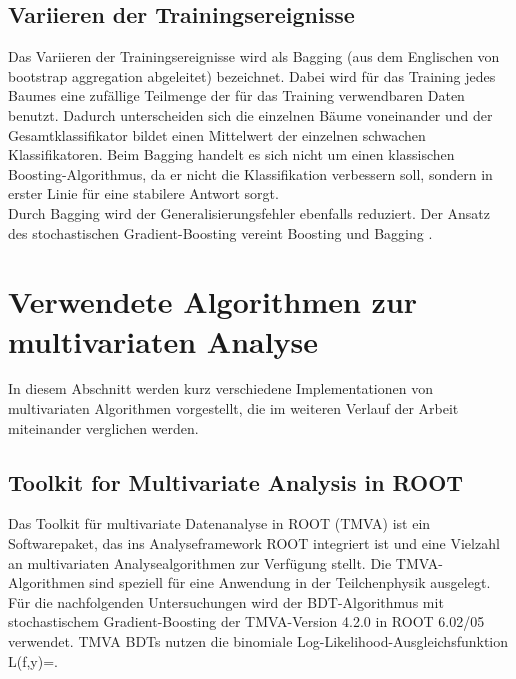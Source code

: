 \subsection{Variieren der Trainingsereignisse}
\label{ch:Algorithmen:subsec:Bagging}

Das Variieren der Trainingsereignisse wird als Bagging (aus dem Englischen von bootstrap aggregation abgeleitet) bezeichnet. Dabei wird f\"ur das Training jedes Baumes eine zuf\"allige Teilmenge der f\"ur das Training verwendbaren Daten benutzt. Dadurch unterscheiden sich die einzelnen B\"aume voneinander und der Gesamtklassifikator bildet einen Mittelwert der einzelnen schwachen Klassifikatoren.
Beim Bagging handelt es sich nicht um einen klassischen Boosting-Algorithmus, da er nicht die Klassifikation verbessern soll, sondern in erster Linie f\"ur eine stabilere Antwort sorgt.\\
Durch Bagging wird der Generalisierungsfehler ebenfalls reduziert.
Der Ansatz des stochastischen Gradient-Boosting vereint Boosting und Bagging \cite{Friedman:2002:SGB:635939.635941}.


\section{Verwendete Algorithmen zur multivariaten Analyse}
\label{ch:Algorithmen:subsec:Implementationen}

In diesem Abschnitt werden kurz verschiedene Implementationen von multivariaten Algorithmen vorgestellt, die im weiteren Verlauf der Arbeit miteinander verglichen werden.

\subsection{Toolkit for Multivariate Analysis in ROOT}
\label{ch:Algorithmen:subsec:TMVA}

Das Toolkit f\"ur multivariate Datenanalyse in ROOT (TMVA) \cite{Hocker:2007ht} ist ein Softwarepaket, das ins Analyseframework ROOT \cite{ROOT} integriert ist und eine Vielzahl an multivariaten Analysealgorithmen zur Verf\"ugung stellt. Die TMVA-Algorithmen sind speziell f\"ur eine Anwendung in der Teilchenphysik ausgelegt.\\
F\"ur die nachfolgenden Untersuchungen wird der BDT-Algorithmus mit stochastischem Gradient-Boosting der TMVA-Version 4.2.0 in ROOT 6.02/05 verwendet. TMVA BDTs nutzen die binomiale Log-Likelihood-Ausgleichsfunktion
\beq
L(f,y)=.
\label{eq:tmva_loss}
\eeq



